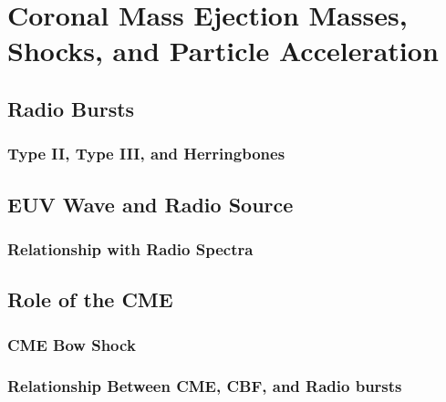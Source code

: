 

\chapter{Coronal Mass Ejection Masses, Shocks, and Particle Acceleration} 
\label{chap:5}


\section{Radio Bursts}\label{sec:1}

\subsection{Type II, Type III, and Herringbones}\label{sec:10}


\section{EUV Wave and Radio Source}\label{sec:2}

\subsection{Relationship with Radio Spectra}\label{sec:20}


\section{Role of the CME}\label{sec:3}

\subsection{CME Bow Shock}\label{sec:30}

\subsection{Relationship Between CME, CBF, and Radio bursts}\label{sec:31}


